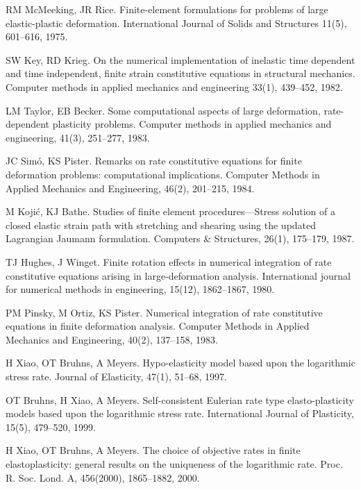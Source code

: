 \documentclass[preprint,review,12pt,sort&compress]{elsarticle}%
\begin{document}
\begin{thebibliography}{99}
RM McMeeking, JR Rice. Finite-element formulations
for problems of large elastic-plastic deformation. International Journal of
Solids and Structures 11(5), 601--616, 1975.

SW Key, RD Krieg. On the numerical implementation of
inelastic time dependent and time independent, finite strain constitutive
equations in structural mechanics. Computer methods in applied mechanics and
engineering 33(1), 439--452, 1982.

LM Taylor, EB Becker. Some computational aspects of
large deformation, rate-dependent plasticity problems. Computer methods in
applied mechanics and engineering, 41(3), 251--277, 1983.

JC Sim\'{o}, KS Pister. Remarks on rate constitutive
equations for finite deformation problems: computational implications.
Computer Methods in Applied Mechanics and Engineering, 46(2), 201--215, 1984.

M Koji\'{c}, KJ Bathe. Studies of finite element
procedures---Stress solution of a closed elastic strain path with stretching
and shearing using the updated Lagrangian Jaumann formulation. Computers \&
Structures, 26(1), 175--179, 1987.

TJ Hughes, J Winget. Finite rotation effects in
numerical integration of rate constitutive equations arising in
large-deformation analysis. International journal for numerical methods in
engineering, 15(12), 1862--1867, 1980.

PM Pinsky, M Ortiz, KS Pister. Numerical
integration of rate constitutive equations in finite deformation analysis.
Computer Methods in Applied Mechanics and Engineering, 40(2), 137--158, 1983.

H Xiao, OT Bruhns, A Meyers. Hypo-elasticity
model based upon the logarithmic stress rate. Journal of Elasticity, 47(1),
51--68, 1997.

OT Bruhns, H Xiao, A Meyers. Self-consistent
Eulerian rate type elasto-plasticity models based upon the logarithmic stress
rate. International Journal of Plasticity, 15(5), 479--520, 1999.

H Xiao, OT Bruhns, A Meyers. The choice of
objective rates in finite elastoplasticity: general results on the uniqueness
of the logarithmic rate. Proc. R. Soc. Lond. A, 456(2000), 1865--1882, 2000.


\end{thebibliography}
\end{document}
